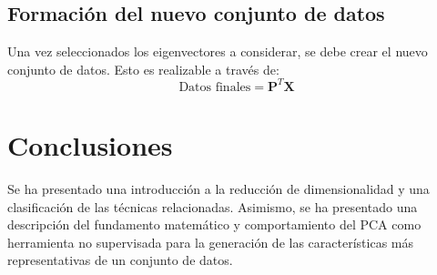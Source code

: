 \documentclass{article}
\begin{document}
\subsection{Formación del nuevo conjunto de datos}
\label{sub:formacion_del_nuevo_conjunto_de_datos}
Una vez seleccionados los eigenvectores a considerar, se debe crear el nuevo conjunto de datos.
Esto es realizable a través de:
$$
\text{Datos finales} = \textbf{P}^T \textbf{X}
$$ 


\section{Conclusiones}
\label{sec:conclusiones}
Se ha presentado una introducción a la reducción de dimensionalidad y una clasificación de las técnicas relacionadas.
Asimismo, se ha presentado una descripción del fundamento matemático y comportamiento del PCA como herramienta no supervisada para la generación de las características más representativas de un conjunto de datos.

\newpage 
\nocite{*}

 
\end{document}
